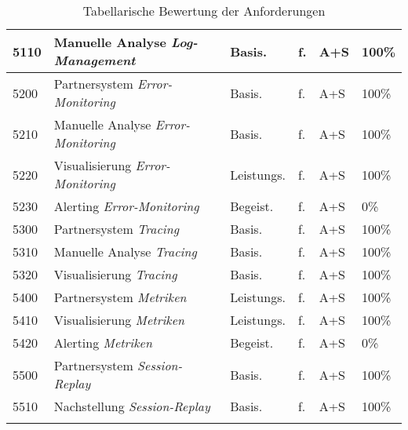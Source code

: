 \begin{longtable}{|p{0.85cm}|p{6.2cm}|p{1.55cm}|p{1.75cm}|p{1.1cm}|p{1.8cm}|}
\hline
5110 & Manuelle Analyse \textit{Log-Management} & Basis. & f. & A+S & 100\% \\
\hline
5200 & Partnersystem \textit{Error-Monitoring} & Basis. & f. & A+S & 100\% \\
\hline
5210 & Manuelle Analyse \textit{Error-Monitoring} & Basis. & f. & A+S & 100\% \\
\hline
5220 & Visualisierung \textit{Error-Monitoring} & Leistungs. & f. & A+S & 100\% \\
\hline
5230 & Alerting  \textit{Error-Monitoring} & Begeist. & f. & A+S & 0\% \\
\hline
5300 & Partnersystem \textit{Tracing} & Basis. & f. & A+S & 100\% \\
\hline
5310 & Manuelle Analyse \textit{Tracing} & Basis. & f. & A+S & 100\% \\
\hline
5320 & Visualisierung \textit{Tracing} & Basis. & f. & A+S & 100\% \\
\hline
5400 & Partnersystem \textit{Metriken} & Leistungs. & f. & A+S & 100\% \\
\hline
5410 & Visualisierung \textit{Metriken} & Leistungs. & f. & A+S & 100\% \\
\hline
5420 & Alerting \textit{Metriken} & Begeist. & f. & A+S & 0\% \\
\hline
5500 & Partnersystem \textit{Session-Replay} & Basis. & f. & A+S & 100\% \\
\hline
5510 & Nachstellung \textit{Session-Replay} & Basis. & f. & A+S & 100\% \\
\hline
\caption{Tabellarische Bewertung der Anforderungen}
\label{tab:anforderungsbewertung}
\end{longtable}
\endgroup
